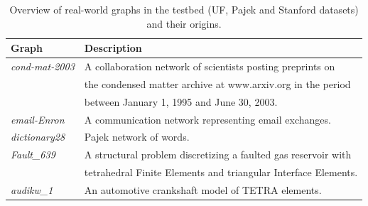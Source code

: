 \begin{table}[!h]
\centering
\caption{Overview of real-world graphs in the testbed (UF, Pajek and Stanford datasets) and their origins.}
\label{tab:real-graphs}
\begin{tabular}{ll}
\hline \hline
{\bf Graph} & {\bf Description} \\ \hline \hline
{\it cond-mat-2003} \cite{Newman06042004} & A collaboration network of scientists posting preprints 
on \\ & the condensed matter archive at www.arxiv.org in the period \\ 
& between January 1, 1995 and June 30, 2003. \\
{\it email-Enron} \cite{Leskovec:2005:GOT:1081870.1081893} & A communication network representing
email exchanges. \\
{\it dictionary28} \cite{pajek2006} & Pajek network of words. \\ 
{\it Fault\_639} \cite{Ferronato20083922} & A structural problem discretizing a faulted gas reservoir with \\
& tetrahedral Finite Elements and triangular Interface Elements. \\
{\it audikw\_1} \cite{Davis97theuniversity} & An automotive crankshaft model of TETRA elements. \\ 

\end{tabular}
\end{table}
